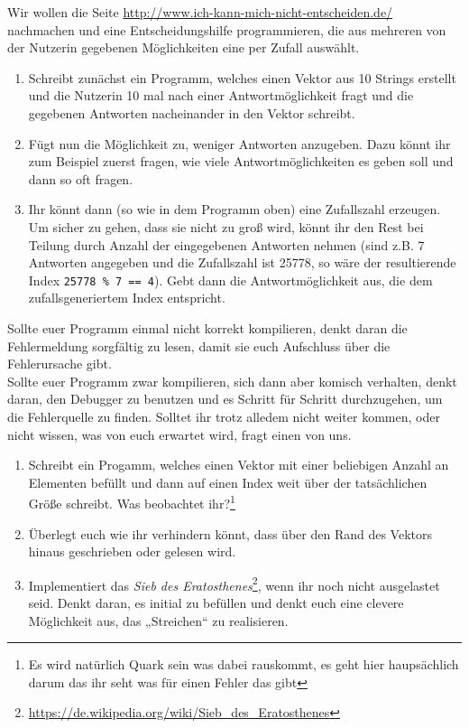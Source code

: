 \begin{praxis}

	Wir wollen die Seite \url{http://www.ich-kann-mich-nicht-entscheiden.de/} nachmachen und eine Entscheidungshilfe programmieren, die aus mehreren von der Nutzerin gegebenen Möglichkeiten eine per Zufall auswählt.

	\begin{enumerate}
		\item
		      Schreibt zunächst ein Programm, welches einen Vektor aus 10 Strings erstellt und die Nutzerin 10 mal nach einer Antwortmöglichkeit fragt und die gegebenen Antworten nacheinander in den Vektor schreibt.
		\item
		      Fügt nun die Möglichkeit zu, weniger Antworten anzugeben.
		      Dazu könnt ihr zum Beispiel zuerst fragen, wie viele Antwortmöglichkeiten es geben soll und dann so oft fragen.
		\item
		      Ihr könnt dann (so wie in dem Programm oben) eine Zufallszahl erzeugen.
		      Um sicher zu gehen, dass sie nicht zu groß wird, könnt ihr den Rest bei Teilung durch Anzahl der eingegebenen Antworten nehmen (sind z.B. 7 Antworten angegeben und die Zufallszahl ist 25778, so wäre der resultierende Index \texttt{25778 \% 7 == 4}).
		      Gebt dann die Antwortmöglichkeit aus, die dem zufallsgeneriertem Index entspricht.
	\end{enumerate}
\end{praxis}

Sollte euer Programm einmal nicht korrekt kompilieren, denkt daran die Fehlermeldung sorgfältig zu lesen, damit sie euch Aufschluss über die Fehlerursache gibt.\\
Sollte euer Programm zwar kompilieren, sich dann aber komisch verhalten, denkt daran, den Debugger zu benutzen und es Schritt für Schritt durchzugehen, um die Fehlerquelle zu finden. Solltet ihr trotz alledem nicht weiter kommen, oder nicht wissen, was von euch erwartet wird, fragt einen von uns.


\begin{spiel}
\begin{enumerate}
	\item
		Schreibt ein Progamm, welches einen Vektor mit einer beliebigen Anzahl an Elementen befüllt und dann auf einen Index weit über der tatsächlichen Größe schreibt.
		Was beobachtet ihr?\footnote{Es wird natürlich Quark sein was dabei rauskommt, es geht hier haupsächlich darum das ihr seht was für einen Fehler das gibt}
	\item 
		Überlegt euch wie ihr verhindern könnt, dass über den Rand des Vektors hinaus geschrieben oder gelesen wird. 
	\item
		Implementiert das \emph{Sieb des Eratosthenes}\footnote{\url{https://de.wikipedia.org/wiki/Sieb_des_Eratosthenes}}, wenn ihr noch nicht ausgelastet seid.
		Denkt daran, es initial zu befüllen und denkt euch eine clevere Möglichkeit aus, das „Streichen“ zu realisieren.
\end{enumerate}
\end{spiel}

